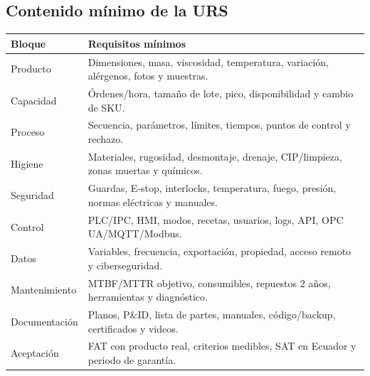 \documentclass[11pt,a4paper]{article}
\begin{document}
\subsection{Contenido mínimo de la URS}
{\small
\begin{xltabular}{\textwidth}{@{}P{3.2cm}L@{}}
\toprule
\textbf{Bloque} & \textbf{Requisitos mínimos}\\ \midrule
Producto & Dimensiones, masa, viscosidad, temperatura, variación, alérgenos, fotos y muestras.\\
Capacidad & Órdenes/hora, tamaño de lote, pico, disponibilidad y cambio de SKU.\\
Proceso & Secuencia, parámetros, límites, tiempos, puntos de control y rechazo.\\
Higiene & Materiales, rugosidad, desmontaje, drenaje, CIP/limpieza, zonas muertas y químicos.\\
Seguridad & Guardas, E-stop, interlocks, temperatura, fuego, presión, normas eléctricas y manuales.\\
Control & PLC/IPC, HMI, modos, recetas, usuarios, logs, API, OPC UA/MQTT/Modbus.\\
Datos & Variables, frecuencia, exportación, propiedad, acceso remoto y ciberseguridad.\\
Mantenimiento & MTBF/MTTR objetivo, consumibles, repuestos 2 años, herramientas y diagnóstico.\\
Documentación & Planos, P\&ID, lista de partes, manuales, código/backup, certificados y videos.\\
Aceptación & FAT con producto real, criterios medibles, SAT en Ecuador y periodo de garantía.\\
\bottomrule
\end{xltabular}}
\end{document}
